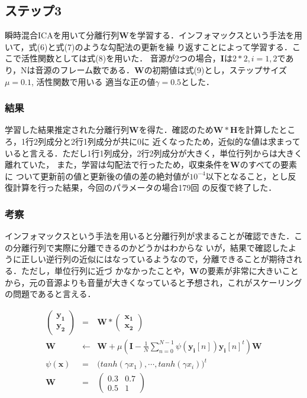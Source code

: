 \documentclass[a4j]{jarticle}
\begin{document}
\subsection{ステップ3}
瞬時混合ICAを用いて分離行列$\bm{W}$を学習する．インフォマックスという手法を用いて，式(6)と式(7)のような勾配法の更新を繰
り返すことによって学習する．ここで活性関数としては式(8)を用いた．
音源が2つの場合，$\bm{I}$は$2*2, i=1,2$であり，Nは音源のフレーム数である．$\bm{W}$の初期値は式(9)とし，ステップサイズ$\mu = 0.1$, 活性関数で用いる
適当な正の値$\gamma = 0.5$とした．
\subsubsection{結果}
学習した結果推定された分離行列$\bm{W}$を得た．確認のため$\bm{W} * \bm{H}$を計算したところ，1行2列成分と2行1列成分が共に0に
近くなったため，近似的な値は求まっていると言える．ただし1行1列成分，2行2列成分が大きく，単位行列からは大きく離れていた，
また，学習は勾配法で行ったため，収束条件を$\bm{W}$のすべての要素に
ついて更新前の値と更新後の値の差の絶対値が$10^{-4}$以下となること，とし反復計算を行った結果，今回のパラメータの場合179回
の反復で終了した．
\subsubsection{考察}
インフォマックスという手法を用いると分離行列が求まることが確認できた．この分離行列で実際に分離できるのかどうかはわからな
いが，結果で確認したように正しい逆行列の近似にはなっているようなので，分離できることが期待される．ただし，単位行列に近づ
かなかったことや，$\bm{W}$の要素が非常に大きいことから，元の音源よりも音量が大きくなっていると予想され，これがスケーリング
の問題であると言える．

\begin{eqnarray}
 \left(
\begin{array}{c}
 \bm{y_1}\\
\bm{y_2}
\end{array}
\right)
&=& \bm{W} * 
\left(
\begin{array}{c}
 \bm{x_1}\\
 \bm{x_2}
\end{array}
\right) \\
 \bm{W} &\leftarrow & \bm{W} + \mu \left(\bm{I} - \frac{1}{N}\sum_{n=0}^{N-1}\psi (\bm{y_i}[n])\bm{y_i}[n]^t \right)\bm{W} \\
 \psi (\bm{x}) &=& \bigl(tanh\left(\gamma x_1\right), \cdots , tanh\left(\gamma x_i\right) \bigr)^t \\
\bm{W} &=& \left(
 \begin{array}{cc}
  0.3 & 0.7\\
  0.5 & 1
 \end{array}
\right)
\end{eqnarray}
\end{document}
